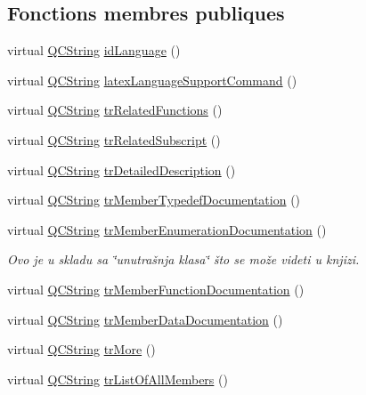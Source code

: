 \subsection*{Fonctions membres publiques}
\begin{DoxyCompactItemize}
\item 
virtual \hyperlink{class_q_c_string}{Q\+C\+String} \hyperlink{class_translator_serbian_a2580f17cd21e0f91bc9775dd0a163ae5}{id\+Language} ()
\item 
virtual \hyperlink{class_q_c_string}{Q\+C\+String} \hyperlink{class_translator_serbian_a54aa2c09cfa4c090dd27f8c1f7ac8f45}{latex\+Language\+Support\+Command} ()
\item 
virtual \hyperlink{class_q_c_string}{Q\+C\+String} \hyperlink{class_translator_serbian_acc0e53868672f3f9243867a686b9e4a9}{tr\+Related\+Functions} ()
\item 
virtual \hyperlink{class_q_c_string}{Q\+C\+String} \hyperlink{class_translator_serbian_a8fe68f00e076364d5936330765388301}{tr\+Related\+Subscript} ()
\item 
virtual \hyperlink{class_q_c_string}{Q\+C\+String} \hyperlink{class_translator_serbian_a1ff22edadca264eb2479eb72ede71506}{tr\+Detailed\+Description} ()
\item 
virtual \hyperlink{class_q_c_string}{Q\+C\+String} \hyperlink{class_translator_serbian_afb494d048acafc08191ef14825bd17ce}{tr\+Member\+Typedef\+Documentation} ()
\item 
virtual \hyperlink{class_q_c_string}{Q\+C\+String} \hyperlink{class_translator_serbian_abd1512013613cc9ae0a6bc43ee68947b}{tr\+Member\+Enumeration\+Documentation} ()
\begin{DoxyCompactList}\small\item\em Ovo je u skladu sa \char`\"{}unutrašnja klasa\char`\"{} što se može videti u knjizi. \end{DoxyCompactList}\item 
virtual \hyperlink{class_q_c_string}{Q\+C\+String} \hyperlink{class_translator_serbian_a53ecd045c02cbfaa34f453ec4ec0ecc0}{tr\+Member\+Function\+Documentation} ()
\item 
virtual \hyperlink{class_q_c_string}{Q\+C\+String} \hyperlink{class_translator_serbian_a38b41a81acc35d80270efad6dcef6daa}{tr\+Member\+Data\+Documentation} ()
\item 
virtual \hyperlink{class_q_c_string}{Q\+C\+String} \hyperlink{class_translator_serbian_ac7995605321e0fdbbd9d8c28cfc58f82}{tr\+More} ()
\item 
virtual \hyperlink{class_q_c_string}{Q\+C\+String} \hyperlink{class_translator_serbian_a1f9399cf2a19ce600af9d3ed0324cd70}{tr\+List\+Of\+All\+Members} ()

\end{DoxyCompactItemize}
